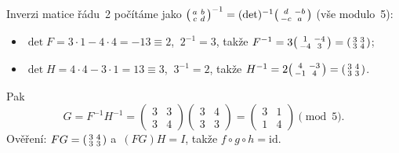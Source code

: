 \begin{enumerate}
    Inverzi matice řádu~2 počítáme jako $\begin{psmallmatrix}a&b\\c&d\end{psmallmatrix}^{-1}=(\det)^{-1}\begin{psmallmatrix}d&-b\\-c&a\end{psmallmatrix}$ (vše modulo~5):
    \begin{itemize}
      \item $\det F=3\cdot1-4\cdot4=-13\equiv2$, $\ 2^{-1}=3$, takže $F^{-1}=3\begin{psmallmatrix}1&-4\\-4&3\end{psmallmatrix}=\begin{psmallmatrix}3&3\\3&4\end{psmallmatrix}$;
      \item $\det H=4\cdot4-3\cdot1=13\equiv3$, $\ 3^{-1}=2$, takže $H^{-1}=2\begin{psmallmatrix}4&-3\\-1&4\end{psmallmatrix}=\begin{psmallmatrix}3&4\\3&3\end{psmallmatrix}$.
    \end{itemize}
    Pak
    \[
      G=F^{-1}H^{-1}=\begin{pmatrix}3&3\\3&4\end{pmatrix}\begin{pmatrix}3&4\\3&3\end{pmatrix}=\begin{pmatrix}3&1\\1&4\end{pmatrix}\pmod 5.
    \]
    Ověření: $FG=\begin{psmallmatrix}3&4\\3&3\end{psmallmatrix}$ a~$(FG)H=I$, takže $f\circ g\circ h=\mathrm{id}$.
\end{enumerate}
